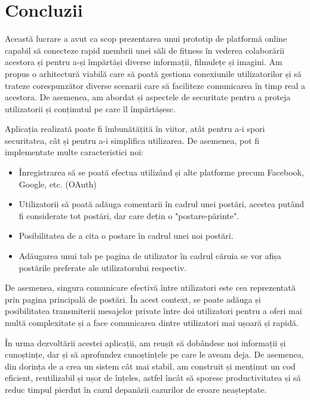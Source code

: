 \chapter{Concluzii}
Această lucrare a avut ca scop prezentarea unui prototip de platformă online capabil să conecteze rapid membrii unei săli de fitness în vederea colaborării acestora și pentru a-și împărtăși diverse informații, filmulețe și imagini.
Am propus o arhitectură viabilă care să poată gestiona conexiunile utilizatorilor și să trateze corespunzător diverse scenarii care să faciliteze comunicarea în timp real a acestora.\newline
De asemenea, am abordat și aspectele de securitate pentru a proteja utilizatorii și conținutul pe care îl împărtășesc.\newline

Aplicația realizată poate fi îmbunătățită în viitor, atât pentru a-i spori securitatea, cât și pentru a-i simplifica utilizarea. De asemenea, pot fi implementate multe caracteristici noi:
\begin{itemize}
	\item{Înregistrarea să se poată efectua utilizând și alte platforme precum Facebook, Google, etc. (OAuth)}
	\item{Utilizatorii să poată adăuga comentarii în cadrul unei postări, acestea putând fi considerate tot postări, dar care dețin o "postare-părinte".}
	\item{Posibilitatea de a cita o postare în cadrul unei noi postări.}
	\item{Adăugarea unui tab pe pagina de utilizator în cadrul căruia se vor afișa postările preferate ale utilizatorului respectiv.}
	\newline
\end{itemize}

De asemenea, singura comunicare efectivă între utilizatori este cea reprezentată prin pagina principală de postări. În acest context, se poate adăuga și posibilitatea transmiterii mesajelor private între doi utilizatori pentru a oferi mai multă complexitate și a face comunicarea dintre utilizatori mai ușoară și rapidă.\newline

În urma dezvoltării acestei aplicații, am reușit să dobândesc noi informații și cunoștințe, dar și să aprofundez cunoștințele pe care le aveam deja. De asemenea, din dorința de a crea un sistem cât mai stabil, am construit și menținut un cod eficient, reutilizabil și ușor de înțeles, astfel încât să sporesc productivitatea și să reduc timpul pierdut în cazul depanării cazurilor de eroare neașteptate.
\label{chap:05}